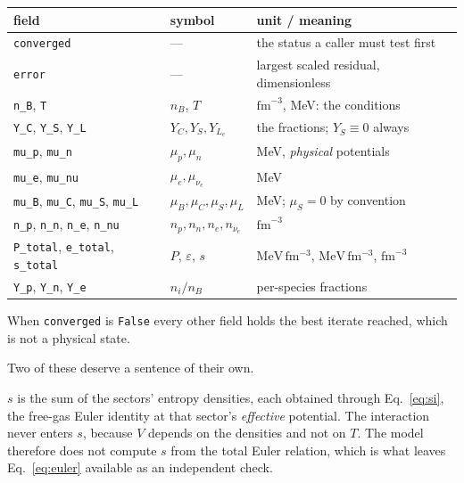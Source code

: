 \documentclass[aps,prc,onecolumn,superscriptaddress,nofootinbib,10pt]{revtex4-2}
\newcommand{\nB}{n_B}
\newcommand{\muB}{\mu_B}
\newcommand{\muC}{\mu_C}
\newcommand{\muS}{\mu_S}
\newcommand{\munue}{\mu_{\nu_e}}
\begin{document}
\begin{center}
\begin{tabular}{lll}
\toprule
field & symbol & unit / meaning \\
\midrule
\texttt{converged} & --- & the status a caller must test first \\
\texttt{error}     & --- & largest scaled residual, dimensionless \\
\midrule
\texttt{n\_B}, \texttt{T} & $\nB$, $T$ & $\mathrm{fm}^{-3}$, MeV: the
                                          conditions \\
\texttt{Y\_C}, \texttt{Y\_S}, \texttt{Y\_L}
   & $Y_C, Y_S, Y_{L_e}$ & the fractions; $Y_S \equiv 0$ always \\
\midrule
\texttt{mu\_p}, \texttt{mu\_n} & $\mu_p, \mu_n$ & MeV, \emph{physical}
                                                  potentials \\
\texttt{mu\_e}, \texttt{mu\_nu} & $\mu_e, \munue$ & MeV \\
\texttt{mu\_B}, \texttt{mu\_C}, \texttt{mu\_S}, \texttt{mu\_L}
   & $\muB, \muC, \muS, \mu_{L}$ & MeV; $\muS = 0$ by convention \\
\midrule
\texttt{n\_p}, \texttt{n\_n}, \texttt{n\_e}, \texttt{n\_nu}
   & $n_p, n_n, n_e, n_{\nu_e}$ & $\mathrm{fm}^{-3}$ \\
\midrule
\texttt{P\_total}, \texttt{e\_total}, \texttt{s\_total}
   & $P$, $\varepsilon$, $s$ & $\mathrm{MeV\,fm^{-3}}$, $\mathrm{MeV\,fm^{-3}}$,
                               $\mathrm{fm}^{-3}$ \\
\midrule
\texttt{Y\_p}, \texttt{Y\_n}, \texttt{Y\_e} & $n_i/\nB$ & per-species
                                                          fractions \\
\bottomrule
\end{tabular}
\end{center}

When \texttt{converged} is \texttt{False} every other field holds the best
iterate reached, which is not a physical state.

Two of these deserve a sentence of their own.

\textbf{$s$} is the sum of the sectors' entropy densities, each obtained
through Eq.~\eqref{eq:si}, the free-gas Euler identity at that sector's
\emph{effective} potential. The interaction never enters $s$, because $V$
depends on the densities and not on $T$. The model therefore does not compute
$s$ from the total Euler relation, which is what leaves
Eq.~\eqref{eq:euler} available as an independent check.
\end{document}
